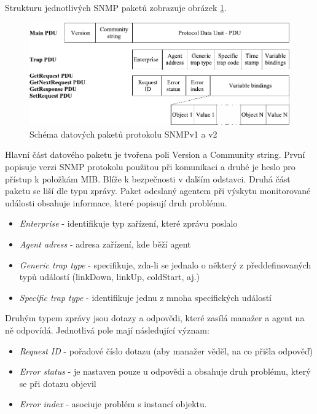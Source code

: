 Strukturu jednotlivých SNMP paketů zobrazuje obrázek \ref{obr_snmp3}.

\begin{figure}[htp]
	\begin{center}
		\includegraphics{obrazky/02_snmp_pdu.pdf}
		\caption{Schéma datových paketů protokolu SNMPv1 a v2}
		\label{obr_snmp3}
	\end{center}
\end{figure}

Hlavní část datového paketu je tvořena poli Version a Community string. První popisuje verzi SNMP protokolu použitou při komunikaci a druhé je heslo pro přístup
k položkám MIB. Blíže k bezpečnosti v dalším odstavci. Druhá část paketu se liší dle typu zprávy. Paket odeslaný agentem při výskytu monitorované události obsahuje
informace, které popisují druh problému.
\begin{itemize}
	\item \textit{Enterprise} - identifikuje typ zařízení, které zprávu poslalo
	\item \textit{Agent adress} - adresa zařízení, kde běží agent
	\item \textit{Generic trap type} - specifikuje, zda-li se jednalo o některý z předdefinovaných typů událostí (linkDown, linkUp, coldStart, aj.)
	\item \textit{Specific trap type} - identifikuje jednu z mnoha specifických událostí
\end{itemize}

Druhým typem zprávy jsou dotazy a odpovědi, které zasílá manažer a agent na ně odpovídá. Jednotlivá pole mají následující význam:
\begin{itemize}
	\item \textit{Request ID} - pořadové číslo dotazu (aby manažer věděl, na co přišla odpověď)
	\item \textit{Error status} - je nastaven pouze u odpovědi a obsahuje druh problému, který se při dotazu objevil
	\item \textit{Error index} - asociuje problém s instancí objektu.
\end{itemize}

